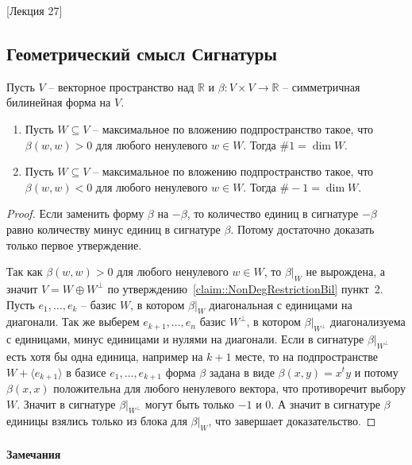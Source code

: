 [Лекция 27]


\subsection{Геометрический смысл Сигнатуры}

\begin{claim}
Пусть $V$ -- векторное пространство над $\mathbb R$ и $\beta\colon V\times V\to \mathbb R$ -- симметричная билинейная форма на $V$.
\begin{enumerate}
\item Пусть $W\subseteq V$ -- максимальное по вложению подпространство такое, что $\beta(w, w) > 0$ для любого ненулевого $w\in W$.
Тогда $\#1 = \dim W$.

\item Пусть $W\subseteq V$ -- максимальное по вложению подпространство такое, что $\beta(w, w) < 0$ для любого ненулевого $w\in W$.
Тогда $\#-1 = \dim W$.
\end{enumerate}
\end{claim}
\begin{proof}
Если заменить форму $\beta$ на $-\beta$, то количество единиц в сигнатуре $-\beta$ равно количеству минус единиц в сигнатуре $\beta$.
Потому достаточно доказать только первое утверждение.


Так как $\beta(w, w) > 0$ для любого ненулевого $w\in W$, то $\beta|_W$ не вырождена, а значит $V = W\oplus W^\bot$  по утверждению~\ref{claim::NonDegRestrictionBil} пункт~2.
Пусть $e_1,\ldots,e_k$ -- базис $W$, в котором $\beta|_W$ диагональная с единицами на диагонали.
Так же выберем $e_{k+1},\ldots,e_n$ базис $W^\bot$, в котором $\beta|_{W^\bot}$ диагонализуема с единицами, минус единицами и нулями на диагонали.
Если в сигнатуре $\beta|_{W^\bot}$ есть хотя бы одна единица, например на $k+1$ месте, то на подпространстве $W+\langle e_{k+1}\rangle$ в базисе $e_1,\ldots,e_{k+1}$ форма $\beta$ задана в виде $\beta(x, y) = x^t y$ и потому $\beta(x,x)$ положительна для любого ненулевого вектора, что противоречит выбору $W$.
Значит в сигнатуре $\beta|_{W^\bot}$ могут быть только $-1$ и $0$.
А значит в сигнатуре $\beta$ единицы взялись только из блока для $\beta|_W$, что завершает доказательство.


\end{proof}

\paragraph{Замечания}

